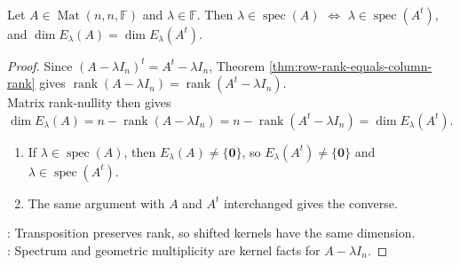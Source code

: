 \begin{proposition} \label{prop:transpose-preserves-spectrum-and-geometric-multiplicity} \\
Let $A\in\operatorname{Mat}(n,n,\mathbb{F})$ and $\lambda\in\mathbb{F}$. Then $\lambda\in\operatorname{spec}(A)$ $\Longleftrightarrow$ $\lambda\in\operatorname{spec}(A^t)$, and $\dim E_{\lambda}(A)=\dim E_{\lambda}(A^t)$.
\begin{proof}
Since $(A-\lambda I_n)^t=A^t-\lambda I_n$, Theorem \ref{thm:row-rank-equals-column-rank} gives $\operatorname{rank}(A-\lambda I_n)=\operatorname{rank}(A^t-\lambda I_n)$.\\
Matrix rank-nullity then gives $\dim E_{\lambda}(A) =n-\operatorname{rank}(A-\lambda I_n) =n-\operatorname{rank}(A^t-\lambda I_n) =\dim E_{\lambda}(A^t)$.
\begin{enumerate}[label=\roman*.]
\setlength{\itemsep}{0pt}
\item[$(\Rightarrow)$] If $\lambda\in\operatorname{spec}(A)$, then $E_{\lambda}(A)\neq\{\mathbf{0}\}$, so $E_{\lambda}(A^t)\neq\{\mathbf{0}\}$ and $\lambda\in\operatorname{spec}(A^t)$.
\item[$(\Leftarrow)$] The same argument with $A$ and $A^t$ interchanged gives the converse.
\end{enumerate}
: Transposition preserves rank, so shifted kernels have the same dimension.\\
: Spectrum and geometric multiplicity are kernel facts for $A-\lambda I_n$.
\end{proof}
\end{proposition}

